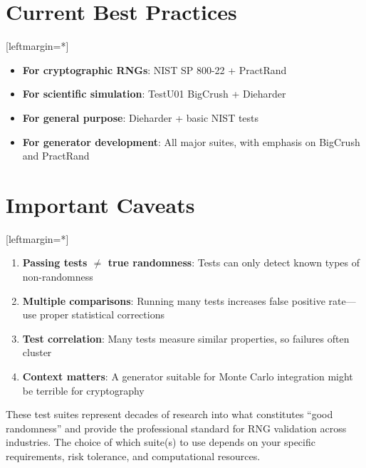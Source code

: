 \documentclass[12pt]{article}
\begin{document}
\section*{Current Best Practices}
[leftmargin=*]
\begin{itemize}
    \item \textbf{For cryptographic RNGs}: NIST SP 800-22 + PractRand
    \item \textbf{For scientific simulation}: TestU01 BigCrush + Dieharder  
    \item \textbf{For general purpose}: Dieharder + basic NIST tests
    \item \textbf{For generator development}: All major suites, with emphasis on BigCrush and PractRand
\end{itemize}

\section*{Important Caveats}
[leftmargin=*]\begin{enumerate}
    \item \textbf{Passing tests $\neq$ true randomness}: Tests can only detect known types of non-randomness
    \item \textbf{Multiple comparisons}: Running many tests increases false positive rate---use proper statistical corrections
    \item \textbf{Test correlation}: Many tests measure similar properties, so failures often cluster
    \item \textbf{Context matters}: A generator suitable for Monte Carlo integration might be terrible for cryptography
\end{enumerate}

These test suites represent decades of research into what constitutes ``good randomness'' and provide the professional standard for RNG validation across industries. The choice of which suite(s) to use depends on your specific requirements, risk tolerance, and computational resources.
\end{document}
